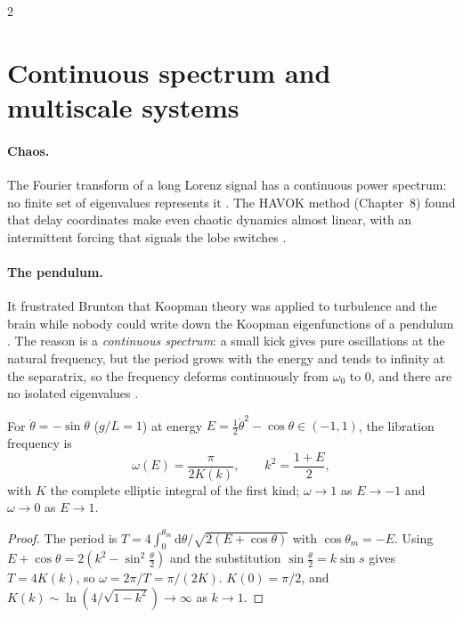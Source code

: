 \begin{paracol}{2}
\section{Continuous spectrum and multiscale systems}\label{sec:ko-continuous}

\paragraph{Chaos.} The Fourier transform of a long Lorenz signal has a continuous power spectrum: no finite
set of eigenvalues represents it . The HAVOK method (Chapter~8) found that
delay coordinates make even chaotic dynamics almost linear, with an intermittent forcing that signals the lobe
switches .

\paragraph{The pendulum.} It frustrated Brunton that Koopman theory was applied to turbulence and the brain
while nobody could write down the Koopman eigenfunctions of a pendulum . The
reason is a \emph{continuous spectrum}: a small kick gives pure oscillations at the natural frequency, but the
period grows with the energy and tends to infinity at the separatrix, so the frequency deforms continuously
from $\omega_0$ to 0, and there are no isolated eigenvalues .

\begin{proposition}\label{prop:ko-pendulum}
For $\ddot\theta=-\sin\theta$ ($g/L=1$) at energy $E=\frac12\dot\theta^2-\cos\theta\in(-1,1)$, the libration
frequency is
\[
  \omega(E)=\frac{\pi}{2K(k)},\qquad k^2=\frac{1+E}{2},
\]
with $K$ the complete elliptic integral of the first kind; $\omega\to1$ as $E\to-1$ and $\omega\to0$ as $E\to1$.
\end{proposition}
\begin{proof}
The period is $T=4\int_0^{\theta_m}\mathrm d\theta/\sqrt{2(E+\cos\theta)}$ with $\cos\theta_m=-E$. Using
$E+\cos\theta=2(k^2-\sin^2\frac\theta2)$ and the substitution $\sin\frac\theta2=k\sin s$ gives $T=4K(k)$, so
$\omega=2\pi/T=\pi/(2K)$. $K(0)=\pi/2$, and $K(k)\sim\ln(4/\sqrt{1-k^2})\to\infty$ as $k\to1$.
\end{proof}


\end{paracol}

